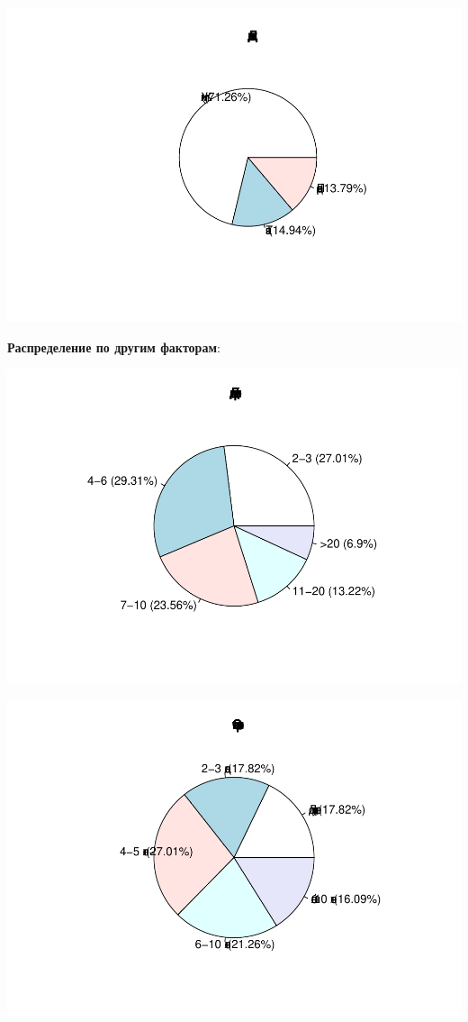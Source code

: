 \documentclass[
]{article}
\begin{document}
\begin{center}\includegraphics{Regression-model-for-estimating-RM_files/figure-latex/unnamed-chunk-7-1} \end{center}

\textbf{Распределение по другим факторам}:

\begin{center}\includegraphics[width=0.85\linewidth]{Regression-model-for-estimating-RM_files/figure-latex/unnamed-chunk-8-1} \end{center}

\begin{center}\includegraphics[width=0.85\linewidth]{Regression-model-for-estimating-RM_files/figure-latex/unnamed-chunk-8-2} \end{center}
\end{document}
